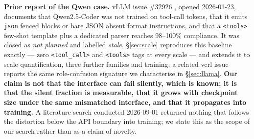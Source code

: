 \textbf{Prior report of the Qwen case.} vLLM issue \#32926 \citep{vllm_issue_32926}, opened
2026-01-23, documents that Qwen2.5-Coder was not trained on tool-call tokens, that it emits
\texttt{json} fenced blocks or bare JSON absent format instructions, and that a \texttt{<tools>}
few-shot template plus a dedicated parser reaches 98--100\% compliance. It was closed as \emph{not
planned} and labelled \emph{stale}. \S\ref{sec:scale} reproduces this baseline exactly --- zero
\texttt{<tool\_call>} and \texttt{<tools>} tags at every scale --- and extends it to scale
quantification, three further families and training; a related verl issue
\citep{verl_issue_4124} reports the same role-confusion signature we characterise in
\S\ref{sec:llama}. \textbf{Our claim is not that the interface can fail silently, which is known;
it is that the silent fraction is measurable, that it grows with checkpoint size under the same
mismatched interface, and that it propagates into training.} A literature search conducted
2026-09-01 returned nothing that follows the distortion below the API boundary into training; we
state this as the scope of our search rather than as a claim of novelty.
